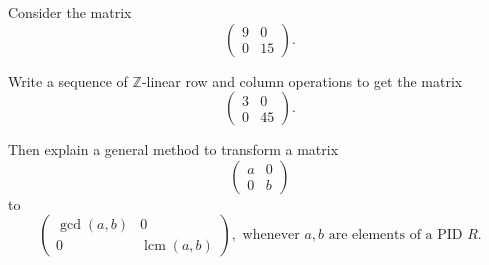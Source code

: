 \documentclass[addpoints,10pt]{exam}
\theoremstyle{plain}
\theoremstyle{definition}
\newtheorem{prob}[thm]{Problem}
\theoremstyle{plain}
\theoremstyle{plain}
\theoremstyle{definition}
\let\oldprob\prob
\let\endoldprob\endprob
\renewenvironment{prob}
  {\begin{singlespace}\oldprob}
  {\endoldprob\end{singlespace}}
\newcommand{\ZZ}{\ensuremath{\mathbb{Z}}}
\DeclareMathOperator{\lcm}{lcm}
\begin{document}
\setcounter{thm}{0}

\begin{prob}
Consider the matrix
\[
\begin{pmatrix}
9 & 0\\
0 & 15
\end{pmatrix}.
\]

Write a sequence of $\ZZ$-linear row and column operations to get the matrix
\[
\begin{pmatrix}
3 & 0\\
0 & 45
\end{pmatrix}.
\]

Then explain a general method to transform a matrix
\[
\begin{pmatrix}
a & 0\\
0 & b
\end{pmatrix}
\]
to
\[
\begin{pmatrix}
\gcd(a,b) & 0\\
0 & \lcm(a,b)
\end{pmatrix},
\text{ whenever $a,b$ are elements of a PID $R$.}\]

\end{prob}
\end{document}

